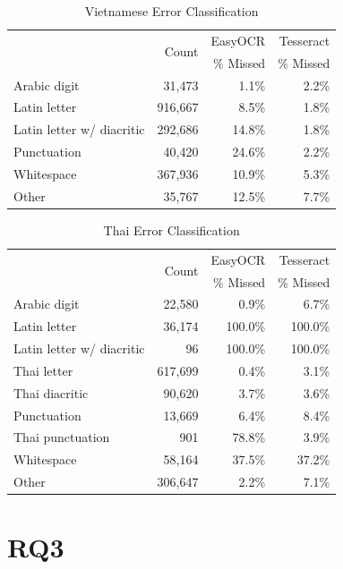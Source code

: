 \documentclass[12pt,oneside]{memoir}
\begin{document}
\begin{table}[ht]
    \caption{Vietnamese Error Classification}
    \label{table:vietnamese-error-classification}
    \centering
    \begin{tabular}{lrrr}
        \toprule
        & \multirow{2}{*}{Count} & EasyOCR & Tesseract\\
        & & \% Missed & \% Missed\\
        \midrule
        Arabic digit & 31,473 & 1.1\% & 2.2\%\\
        Latin letter & 916,667 & 8.5\% & 1.8\%\\
        Latin letter w/ diacritic & 292,686 & 14.8\% & 1.8\%\\
        Punctuation & 40,420 & 24.6\% & 2.2\%\\
        Whitespace & 367,936 & 10.9\% & 5.3\%\\
        Other & 35,767 & 12.5\% & 7.7\%\\
        \bottomrule
    \end{tabular}
\end{table}

\begin{table}[ht]
    \caption{Thai Error Classification}
    \label{table:thai-error-classification}
    \centering
    \begin{tabular}{lrrr}
        \toprule
        & \multirow{2}{*}{Count} & EasyOCR & Tesseract\\
        & & \% Missed & \% Missed\\
        \midrule
        Arabic digit & 22,580 & 0.9\% & 6.7\%\\
        Latin letter & 36,174 & 100.0\% & 100.0\%\\
        Latin letter w/ diacritic & 96 & 100.0\% & 100.0\%\\
        Thai letter & 617,699 & 0.4\% & 3.1\%\\
        Thai diacritic & 90,620 & 3.7\% & 3.6\%\\
        Punctuation & 13,669 & 6.4\% & 8.4\%\\
        Thai punctuation & 901 & 78.8\% & 3.9\%\\
        Whitespace & 58,164 & 37.5\% & 37.2\%\\
        Other & 306,647 & 2.2\% & 7.1\%\\
        \bottomrule
    \end{tabular}
\end{table}

\section{RQ3}
\end{document}
